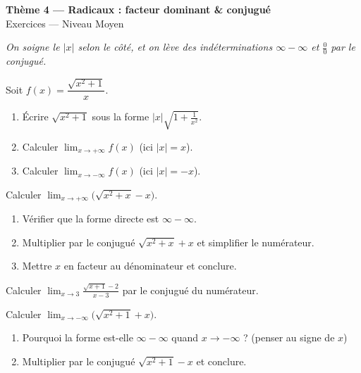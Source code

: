 \documentclass[11pt,a4paper]{article}
\begin{document}
\begin{center}
{\Large\bfseries\color{primarydark}Thème 4 — Radicaux : facteur dominant \& conjugué}\\[2pt]
{\large\color{primary}Exercices — Niveau Moyen}
\end{center}
\vspace{4pt}
{\small\itshape On soigne le $|x|$ selon le côté, et on lève des indéterminations $\infty-\infty$ et
$\frac00$ par le conjugué.}
\vspace{6pt}

\begin{exercice}
Soit $f(x)=\dfrac{\sqrt{x^2+1}}{x}$.
\begin{enumerate}[label=\alph*),leftmargin=2em,itemsep=3pt]
  \item Écrire $\sqrt{x^2+1}$ sous la forme $|x|\sqrt{1+\frac{1}{x^2}}$.
  \item Calculer $\displaystyle\lim_{x\to+\infty} f(x)$ (ici $|x|=x$).
  \item Calculer $\displaystyle\lim_{x\to-\infty} f(x)$ (ici $|x|=-x$).
\end{enumerate}
\end{exercice}

\begin{exercice}
Calculer $\displaystyle\lim_{x\to+\infty}\bigl(\sqrt{x^2+x}-x\bigr)$.
\begin{enumerate}[label=\alph*),leftmargin=2em,itemsep=3pt]
  \item Vérifier que la forme directe est $\infty-\infty$.
  \item Multiplier par le conjugué $\sqrt{x^2+x}+x$ et simplifier le numérateur.
  \item Mettre $x$ en facteur au dénominateur et conclure.
\end{enumerate}
\end{exercice}

\begin{exercice}
Calculer $\displaystyle\lim_{x\to 3}\frac{\sqrt{x+1}-2}{x-3}$ par le conjugué du numérateur.
\end{exercice}

\begin{exercice}
Calculer $\displaystyle\lim_{x\to-\infty}\bigl(\sqrt{x^2+1}+x\bigr)$.
\begin{enumerate}[label=\alph*),leftmargin=2em,itemsep=3pt]
  \item Pourquoi la forme est-elle $\infty-\infty$ quand $x\to-\infty$ ? (penser au signe de $x$)
  \item Multiplier par le conjugué $\sqrt{x^2+1}-x$ et conclure.
\end{enumerate}
\end{exercice}
\end{document}
